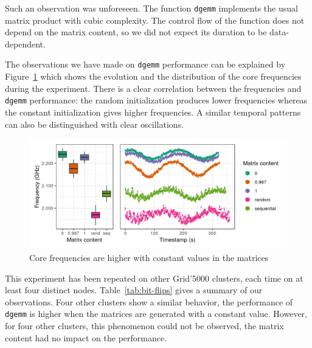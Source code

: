         Such an observation was unforeseen. The function \texttt{dgemm} implements the usual matrix product with cubic
        complexity. The control flow of the function does not depend on the matrix content, so we did not expect its
        duration to be data-dependent.

        The observations we have made on \texttt{dgemm} performance can be explained by
        Figure~\ref{fig:exp:bit-flips:method-freq} which shows the evolution and the distribution of the core
        frequencies during the experiment. There is a clear correlation between the frequencies and \texttt{dgemm}
        performance: the random initialization produces lower frequencies whereas the constant initialization gives
        higher frequencies. A similar temporal patterns can also be distinguished with clear oscillations.

        \begin{figure}[htbp]
            \centering
            \includegraphics[width=\textwidth]{img/experiment/bit-flips/generation_method_freq.png}
            \caption{\label{fig:exp:bit-flips:method-freq}
            Core frequencies are higher with constant values in the matrices}
        \end{figure}

        This experiment has been repeated on other Grid'5000 clusters, each time on at least four distinct nodes.
        Table~\ref{tab:bit-flips} gives a summary of our observations. Four other clusters show a similar behavior, the
        performance of \texttt{dgemm} is higher when the matrices are generated with a constant value. However, for four
        other clusters, this phenomenon could not be observed, the matrix content had no impact on the performance.

